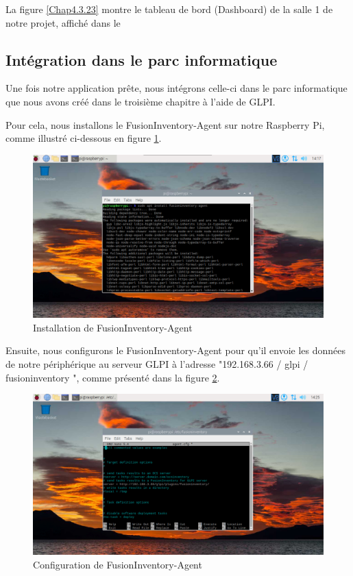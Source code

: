 La figure \ref{Chap4.3.23} montre le tableau de bord (Dashboard) de la salle 1 de notre projet, affiché dans le
\subsection{Intégration dans le parc informatique}

Une fois notre application prête, nous intégrons celle-ci dans le parc informatique que nous avons créé dans le troisième chapitre à l'aide de GLPI.

Pour cela, nous installons le FusionInventory-Agent sur notre Raspberry Pi, comme illustré ci-dessous en figure \ref{fig:raspberry-fusion}.

\begin{figure}[H]
\centering
\includegraphics[width=15cm]{Images/raspberryfusion.png}
\caption{Installation de FusionInventory-Agent}
\label{fig:raspberry-fusion}
\end{figure}

Ensuite, nous configurons le FusionInventory-Agent pour qu'il envoie les données de notre périphérique au serveur GLPI à l'adresse "192.168.3.66 / glpi / fusioninventory ", comme présenté dans la figure \ref{fig:raspberry-fusion-config}.

\begin{figure}[H]
\centering
\includegraphics[width=15cm]{Images/raspberryfusion1.png}
\caption{Configuration de FusionInventory-Agent}
\label{fig:raspberry-fusion-config}
\end{figure}

